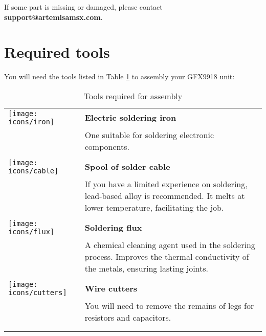If some part is missing or damaged, please contact {\bf support@artemisamsx.com}.

\section{Required tools}

You will need the tools listed in Table \ref{table:assembly-tools} to assembly your GFX9918 unit:

\begin{longtable}{m{10mm}|m{100mm}}
	\centering
	\texttt{[image: icons/iron]}    & {\bf Electric soldering iron}                                                                                                        \\
	                                & One suitable for soldering electronic components.                                                                                    \\
	                                &                                                                                                                                      \\
	\texttt{[image: icons/cable]}   & {\bf Spool of solder cable}                                                                                                          \\
	                                & If you have a limited experience on soldering, lead-based alloy is recommended. It melts at lower temperature, facilitating the job. \\
	                                &                                                                                                                                      \\
	\texttt{[image: icons/flux]}    & {\bf Soldering flux}                                                                                                                 \\
	                                & A chemical cleaning agent used in the soldering process. Improves the thermal conductivity of the metals, ensuring lasting joints.   \\
	                                &                                                                                                                                      \\
	\texttt{[image: icons/cutters]} & {\bf Wire cutters}                                                                                                                   \\
	                                & You will need to remove the remains of legs for resistors and capacitors.                                                            \\
	                                &                                                                                                                                      \\
	\caption{Tools required for assembly}
	\label{table:assembly-tools}
\end{longtable}

